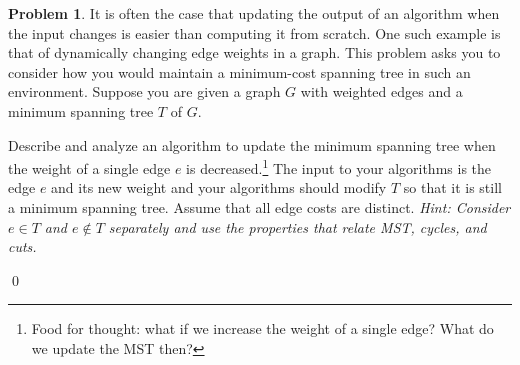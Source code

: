 \documentclass[11pt]{article}
\theoremstyle{definition}
\newtheorem{question}{Problem}
\newenvironment{solution}{\bigskip\noindent{\it Solution.}  \ignorespaces}{\hfill\qed}
\begin{document}
\newpage

\begin{question} 
It is often the case that updating the output of an algorithm when the input changes is easier than computing it from scratch.
One such example is that of dynamically changing edge weights in a graph.  This problem asks you to consider how you would maintain a minimum-cost spanning tree in
such an environment.  Suppose you are given a graph $G$ with weighted edges and a minimum spanning tree $T$ of $G$. 
		

	Describe and analyze an algorithm to update the minimum spanning tree when the weight of a single edge $e$ is decreased.\footnote{Food for thought: what if we increase the weight of a single edge? What do we update the MST then?}  
	 The input to your algorithms is the edge $e$ and its new weight and your algorithms should modify $T$ so that it is still a minimum spanning tree. 
Assume that all edge costs are distinct. 
 {\em Hint:  Consider $e \in T$ and $e \not\in T$ separately and use the properties that relate MST, cycles, and cuts.}
\end{question}


\begin{solution}
\end{solution}

\newpage
\end{document}
